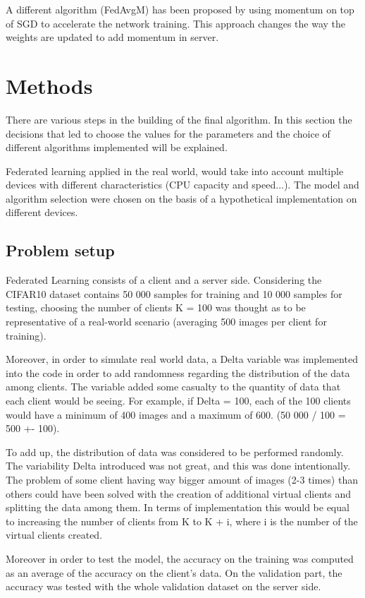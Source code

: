 \documentclass[twocolumn]{article}
\begin{document}
A different algorithm (FedAvgM) has been proposed by \cite{DBLP:journals/corr/abs-1909-06335} using momentum on top of SGD to accelerate the network training. This approach changes the way the weights are updated to add momentum in server.

\section{Methods} %
There are various steps in the building of the final algorithm. In this section the decisions that led to choose the values for the parameters and the choice of different algorithms implemented will be explained. 

Federated learning applied in the real world, would take into account multiple devices with different characteristics (CPU capacity and speed...). The model and algorithm selection were chosen on the basis of a hypothetical implementation on different devices.  

\subsection{Problem setup}
Federated Learning consists of a client and a server side. Considering the CIFAR10 dataset contains 50 000 samples for training and 10 000 samples for testing, choosing the number of clients K = 100 was thought as to be representative of a real-world scenario (averaging 500 images per client for training). 

Moreover, in order to simulate real world data, a Delta variable was implemented into the code in order to add randomness regarding the distribution of the data among clients. The variable added some casualty to the quantity of data that each client would be seeing. For example, if Delta = 100, each of the 100 clients would have a minimum of 400 images and a maximum of 600. (50 000 / 100 = 500 +- 100).


To add up, the distribution of data was considered to be performed randomly. The variability Delta introduced was not great, and this was done intentionally. The problem of some client having way bigger amount of images (2-3 times) than others could have been solved with the creation of additional virtual clients and splitting the data among them. In terms of implementation this would be equal to increasing the number of clients from K to K + i, where i is the number of the virtual clients created. 

Moreover in order to test the model, the accuracy on the training was computed as an average of the accuracy on the client's data. On the validation part, the accuracy was tested with the whole validation dataset on the server side.
\end{document}
